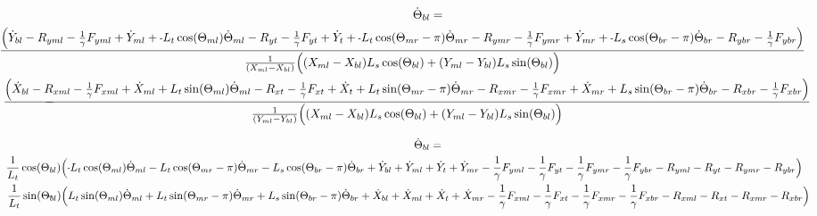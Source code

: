 \documentclass[11pt, landscape]{article}
\newcommand{\mn}{\scalebox{0.7}[1.0]{-}}
\begin{document}
\begin{multline}
\dot{\Theta}_{bl} = \\
\hspace*{-1.5cm}\frac{\Big( \dot{Y}_{bl} - R_{yml} - \frac{1}{\gamma}F_{yml} + \dot{Y}_{ml} + \mn L_{t}\cos(\Theta_{ml}) \dot{\Theta}_{ml}
- R_{yt} - \frac{1}{\gamma}F_{yt } + \dot{Y}_{t } + \mn L_{t}\cos(\Theta_{mr}-\pi)  \dot{\Theta}_{mr} - R_{ymr} - \frac{1}{\gamma}F_{ymr} + \dot{Y}_{mr}
+ \mn L_{s}\cos(\Theta_{br}-\pi)  \dot{\Theta}_{br} - R_{ybr} - \frac{1}{\gamma}F_{ybr} \Big)}
{\frac{1}{(X_{ml} - X_{bl})}\Big( (X_{ml} - X_{bl}) L_{s}\cos(\Theta_{bl}) + (Y_{ml} - Y_{bl})L_{s}\sin(\Theta_{bl}) \Big)} \\
- \hspace*{-1.5cm}\frac{\Big( \dot{X}_{bl} - R_{xml} - \frac{1}{\gamma}F_{xml} + \dot{X}_{ml} + L_{t}\sin(\Theta_{ml}) \dot{\Theta}_{ml} - R_{xt } - \frac{1}{\gamma}F_{xt }
+ \dot{X}_{t } + L_{t}\sin(\Theta_{mr}-\pi)  \dot{\Theta}_{mr} - R_{xmr}  -\frac{1}{\gamma}F_{xmr} + \dot{X}_{mr} + L_{s}\sin(\Theta_{br}-\pi)  \dot{\Theta}_{br} - R_{xbr} - \frac{1}{\gamma}F_{xbr} \Big)}
{\frac{1}{(Y_{ml} - Y_{bl})}\Big( (X_{ml} - X_{bl}) L_{s}\cos(\Theta_{bl}) + (Y_{ml} - Y_{bl})L_{s}\sin(\Theta_{bl}) \Big)}
\end{multline}

\begin{multline}
\dot{\Theta}_{bl} = \\
\hspace*{-1.5cm}\frac{1}{L_t}\cos(\Theta_{bl})\Big( \mn L_{t}\cos(\Theta_{ml})\dot{\Theta}_{ml} - L_{t}\cos(\Theta_{mr}-\pi)\dot{\Theta}_{mr} - L_{s}\cos(\Theta_{br}-\pi)\dot{\Theta}_{br}
+ \dot{Y}_{bl} + \dot{Y}_{ml} + \dot{Y}_{t } + \dot{Y}_{mr} - \frac{1}{\gamma}F_{yml} - \frac{1}{\gamma}F_{yt } - \frac{1}{\gamma}F_{ymr} - \frac{1}{\gamma}F_{ybr} - R_{yml} - R_{yt} - R_{ymr} - R_{ybr} \Big)\\
- \hspace*{-1.5cm}\frac{1}{L_t}\sin(\Theta_{bl})\Big( L_{t}\sin(\Theta_{ml})\dot{\Theta}_{ml} + L_{t}\sin(\Theta_{mr}-\pi)\dot{\Theta}_{mr} + L_{s}\sin(\Theta_{br}-\pi)\dot{\Theta}_{br}
+ \dot{X}_{bl} + \dot{X}_{ml} + \dot{X}_{t } + \dot{X}_{mr} - \frac{1}{\gamma}F_{xml} - \frac{1}{\gamma}F_{xt } - \frac{1}{\gamma}F_{xmr} - \frac{1}{\gamma}F_{xbr} - R_{xml} - R_{xt } - R_{xmr} - R_{xbr} \Big)
\end{multline}
\end{document}
